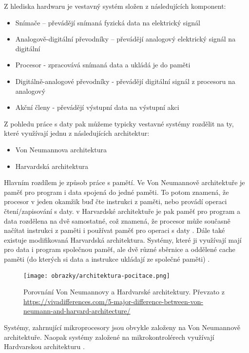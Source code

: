 Z hlediska hardwaru je vestavný systém složen z následujících komponent:
\begin{itemize}
    \item Snímače -- převádějí snímaná fyzická data na elektrický signál
    \item Analogově-digitální převodníky -- převádějí analogový elektrický signál na digitální
    \item Procesor - zpracovává snímaná data a ukládá je do paměti
    \item Digitálně-analogové převodníky - převádějí digitální signál z procesoru na analogový
    \item Akční členy - převádějí výstupní data na výstupní akci \cite{ESArchitecture}
\end{itemize}

Z pohledu práce s daty pak můžeme typicky vestavné systémy rozdělit na ty, které využívají jednu z následujících architektur:
\begin{itemize}
    \item Von Neumannova architektura
    \item Harvardská architektura
\end{itemize}

Hlavním rozdílem je způsob práce s pamětí. Ve Von Neumannově architektuře je paměť pro program i data spojená do jedné paměti. To potom znamená, že procesor v jeden okamžik buď čte instrukci z paměti, nebo provádí operaci čtení/zapisování s daty.
v Harvardské architektuře je pak paměť pro program a data rozdělena na dvě samostatné, což znamená, že procesor může současně načítat instrukci z paměti i používat paměť pro operaci s daty \cite{ESOverview}.
Dále také existuje modifikovaná Harvardská architektura. Systémy, které ji využívají mají pro data i program společnou paměť, ale dvě různé sběrnice a oddělené cache paměti (do kterých si data a instrukce ukládají ze společné paměti) \cite{ModifiedHarvard}.

\begin{figure}[hbt]
	\centering
	\texttt{[image: obrazky/architektura-pocitace.png]}
	\caption{Porovnání Von Neumannovy a Hardvarské architektury. Převzato z \url{https://vivadifferences.com/5-major-difference-between-von-neumann-and-harvard-architecture/}}
	\label{von-neuman-hardvard}
\end{figure}

Systémy, zahrnující mikroprocesory jsou obvykle založeny na Von Neumannově architektuře. Naopak systémy založené na mikrokontrolérech využívají Hardvarskou architekturu \cite{uCvsCPU}.

